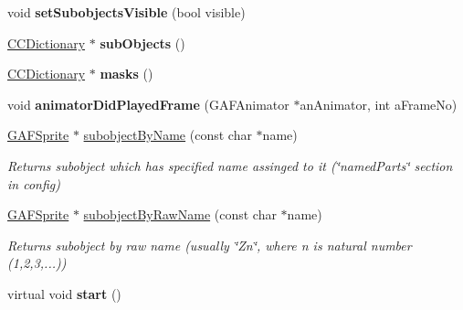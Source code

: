\begin{DoxyCompactItemize}
\item 
\hypertarget{class_g_a_f_1_1_g_a_f_animated_object_a3722264e5f62006becddfc3da224773d}{void {\bfseries set\-Subobjects\-Visible} (bool visible)}\label{class_g_a_f_1_1_g_a_f_animated_object_a3722264e5f62006becddfc3da224773d}

\item 
\hypertarget{class_g_a_f_1_1_g_a_f_animated_object_a9b6a67190546750f2117f3718853a4ba}{\hyperlink{class_g_a_f_1_1_c_c_dictionary}{C\-C\-Dictionary} $\ast$ {\bfseries sub\-Objects} ()}\label{class_g_a_f_1_1_g_a_f_animated_object_a9b6a67190546750f2117f3718853a4ba}

\item 
\hypertarget{class_g_a_f_1_1_g_a_f_animated_object_a84523a9d2b00c0350e31789441948bed}{\hyperlink{class_g_a_f_1_1_c_c_dictionary}{C\-C\-Dictionary} $\ast$ {\bfseries masks} ()}\label{class_g_a_f_1_1_g_a_f_animated_object_a84523a9d2b00c0350e31789441948bed}

\item 
\hypertarget{class_g_a_f_1_1_g_a_f_animated_object_ab5c38540a8b243411c1c21dec2632824}{void {\bfseries animator\-Did\-Played\-Frame} (G\-A\-F\-Animator $\ast$an\-Animator, int a\-Frame\-No)}\label{class_g_a_f_1_1_g_a_f_animated_object_ab5c38540a8b243411c1c21dec2632824}

\item 
\hypertarget{class_g_a_f_1_1_g_a_f_animated_object_ac2748e6b953d2e7d09df4b332522bb53}{\hyperlink{class_g_a_f_1_1_g_a_f_sprite}{G\-A\-F\-Sprite} $\ast$ \hyperlink{class_g_a_f_1_1_g_a_f_animated_object_ac2748e6b953d2e7d09df4b332522bb53}{subobject\-By\-Name} (const char $\ast$name)}\label{class_g_a_f_1_1_g_a_f_animated_object_ac2748e6b953d2e7d09df4b332522bb53}

\begin{DoxyCompactList}\small\item\em Returns subobject which has specified name assinged to it (\char`\"{}named\-Parts\char`\"{} section in config) \end{DoxyCompactList}\item 
\hypertarget{class_g_a_f_1_1_g_a_f_animated_object_a7c206c5202dc72fdf75a6b5c8c5a64d1}{\hyperlink{class_g_a_f_1_1_g_a_f_sprite}{G\-A\-F\-Sprite} $\ast$ \hyperlink{class_g_a_f_1_1_g_a_f_animated_object_a7c206c5202dc72fdf75a6b5c8c5a64d1}{subobject\-By\-Raw\-Name} (const char $\ast$name)}\label{class_g_a_f_1_1_g_a_f_animated_object_a7c206c5202dc72fdf75a6b5c8c5a64d1}

\begin{DoxyCompactList}\small\item\em Returns subobject by raw name (usually \char`\"{}\-Zn\char`\"{}, where n is natural number (1,2,3,...)) \end{DoxyCompactList}\item 
\hypertarget{class_g_a_f_1_1_g_a_f_animated_object_a473c7993b81371f99b4e9b2f53b732f3}{virtual void {\bfseries start} ()}\label{class_g_a_f_1_1_g_a_f_animated_object_a473c7993b81371f99b4e9b2f53b732f3}


\end{DoxyCompactItemize}
